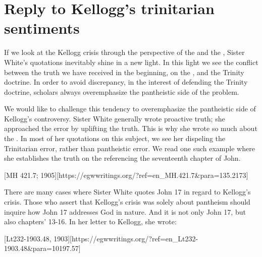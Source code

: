 \chapter{Reply to Kellogg’s trinitarian sentiments}

If we look at the Kellogg crisis through the perspective of the  and the , Sister White’s quotations inevitably shine in a new light. In this light we see the conflict between the truth we have received in the beginning, on the , and the Trinity doctrine. In order to avoid discrepancy, in the interest of defending the Trinity doctrine, scholars always overemphasize the pantheistic side of the problem.

We would like to challenge this tendency to overemphasize the pantheistic side of Kellogg’s controversy. Sister White generally wrote proactive truth; she approached the error by uplifting the truth. This is why she wrote so much about the . In most of her quotations on this subject, we see her dispeling the Trinitarian error, rather than pantheistic error. We read one such example where she establishes the truth on the  referencing the seventeenth chapter of John.

[MH 421.7; 1905][https://egwwritings.org/?ref=en\_MH.421.7&para=135.2173]

There are many cases where Sister White quotes John 17 in regard to Kellogg’s crisis. Those who assert that Kellogg’s crisis was solely about pantheism should inquire how John 17 addresses God in nature. And it is not only John 17, but also chapters’ 13-16. In her letter to Kellogg, she wrote:

[Lt232-1903.48, 1903][https://egwwritings.org/?ref=en\_Lt232-1903.48&para=10197.57]

